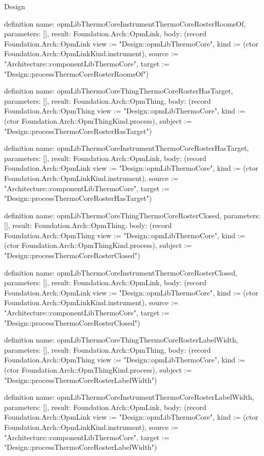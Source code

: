 \begin{lexlean}{Design}
\begin{semanticmodule}
definition{
  name: opmLibThermoCoreInstrumentThermoCoreRosterRoomsOf,
  parameters: [],
  result: Foundation.Arch::OpmLink,
  body: (record Foundation.Arch::OpmLink {view := "Design::opmLibThermoCore", kind := (ctor Foundation.Arch::OpmLinkKind.instrument), source := "Architecture::componentLibThermoCore", target := "Design::processThermoCoreRosterRoomsOf"})
}

definition{
  name: opmLibThermoCoreThingThermoCoreRosterHasTarget,
  parameters: [],
  result: Foundation.Arch::OpmThing,
  body: (record Foundation.Arch::OpmThing {view := "Design::opmLibThermoCore", kind := (ctor Foundation.Arch::OpmThingKind.process), subject := "Design::processThermoCoreRosterHasTarget"})
}

definition{
  name: opmLibThermoCoreInstrumentThermoCoreRosterHasTarget,
  parameters: [],
  result: Foundation.Arch::OpmLink,
  body: (record Foundation.Arch::OpmLink {view := "Design::opmLibThermoCore", kind := (ctor Foundation.Arch::OpmLinkKind.instrument), source := "Architecture::componentLibThermoCore", target := "Design::processThermoCoreRosterHasTarget"})
}

definition{
  name: opmLibThermoCoreThingThermoCoreRosterClosed,
  parameters: [],
  result: Foundation.Arch::OpmThing,
  body: (record Foundation.Arch::OpmThing {view := "Design::opmLibThermoCore", kind := (ctor Foundation.Arch::OpmThingKind.process), subject := "Design::processThermoCoreRosterClosed"})
}

definition{
  name: opmLibThermoCoreInstrumentThermoCoreRosterClosed,
  parameters: [],
  result: Foundation.Arch::OpmLink,
  body: (record Foundation.Arch::OpmLink {view := "Design::opmLibThermoCore", kind := (ctor Foundation.Arch::OpmLinkKind.instrument), source := "Architecture::componentLibThermoCore", target := "Design::processThermoCoreRosterClosed"})
}

definition{
  name: opmLibThermoCoreThingThermoCoreRosterLabelWidth,
  parameters: [],
  result: Foundation.Arch::OpmThing,
  body: (record Foundation.Arch::OpmThing {view := "Design::opmLibThermoCore", kind := (ctor Foundation.Arch::OpmThingKind.process), subject := "Design::processThermoCoreRosterLabelWidth"})
}

definition{
  name: opmLibThermoCoreInstrumentThermoCoreRosterLabelWidth,
  parameters: [],
  result: Foundation.Arch::OpmLink,
  body: (record Foundation.Arch::OpmLink {view := "Design::opmLibThermoCore", kind := (ctor Foundation.Arch::OpmLinkKind.instrument), source := "Architecture::componentLibThermoCore", target := "Design::processThermoCoreRosterLabelWidth"})
}


\end{semanticmodule}
\end{lexlean}
